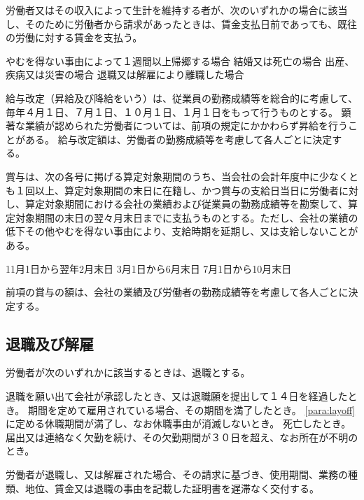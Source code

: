 \documentclass[10pt,a4paper,uplatex]{jsarticle}
\begin{document}
労働者又はその収入によって生計を維持する者が、次のいずれかの場合に該当し、そのために労働者から請求があったときは、賃金支払日前であっても、既往の労働に対する賃金を支払う。
\begin{enumerate}
    \itm やむを得ない事由によって１週間以上帰郷する場合
    \itm 結婚又は死亡の場合
    \itm 出産、疾病又は災害の場合
    \itm 退職又は解雇により離職した場合
\end{enumerate}

給与改定（昇給及び降給をいう）は、従業員の勤務成績等を総合的に考慮して、毎年４月１日、７月１日、１０月１日、１月１日をもって行うものとする。
\term
顕著な業績が認められた労働者については、前項の規定にかかわらず昇給を行うことがある。
\term
給与改定額は、労働者の勤務成績等を考慮して各人ごとに決定する。

賞与は、次の各号に掲げる算定対象期間のうち、当会社の会計年度中に少なくとも１回以上、算定対象期間の末日に在籍し、かつ賞与の支給日当日に労働者に対し、算定対象期間における会社の業績および従業員の勤務成績等を勘案して、算定対象期間の末日の翌々月末日までに支払うものとする。ただし、会社の業績の低下その他やむを得ない事由により、支給時期を延期し、又は支給しないことがある。
\begin{enumerate}
    \itm 11月1日から翌年2月末日
    \itm 3月1日から6月末日
    \itm 7月1日から10月末日 
\end{enumerate}
\term
前項の賞与の額は、会社の業績及び労働者の勤務成績等を考慮して各人ごとに決定する。


\subsection{退職及び解雇}

労働者が次のいずれかに該当するときは、退職とする。
\begin{enumerate}
    \itm 退職を願い出て会社が承認したとき、又は退職願を提出して１４日を経過したとき。
    \itm 期間を定めて雇用されている場合、その期間を満了したとき。
    \itm \ref{para:layoff}に定める休職期間が満了し、なお休職事由が消滅しないとき。
    \itm 死亡したとき。
    \itm 届出又は連絡なく欠勤を続け、その欠勤期間が３０日を超え、なお所在が不明のとき。
\end{enumerate}
\term
労働者が退職し、又は解雇された場合、その請求に基づき、使用期間、業務の種類、地位、賃金又は退職の事由を記載した証明書を遅滞なく交付する。
\end{document}
